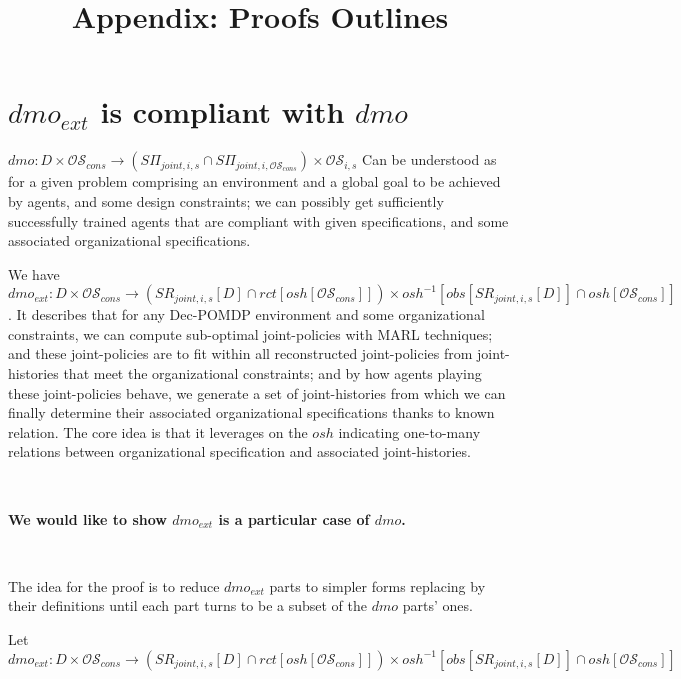 \documentclass{ecai}
\newcounter{relation}
\newcounter{proof}
\begin{document}

\begin{frontmatter}

    \title{Appendix: Proofs Outlines}

\end{frontmatter}


\section{$dmo_{ext}$ is compliant with $dmo$}

$dmo: D \times \mathcal{OS}_{cons} \rightarrow (S\Pi_{joint,i,s} \cap S\Pi_{joint,i,\mathcal{OS}_{cons}}) \times \mathcal{OS}_{i,s}$
Can be understood as for a given problem comprising an environment and a global goal to be achieved by agents, and some design constraints; we can possibly get sufficiently successfully trained agents that are compliant with given specifications, and some associated organizational specifications.

We have $dmo_{ext}: D \times \mathcal{OS}_{cons} \rightarrow (SR_{joint,i,s}[D] \cap rct[osh[\mathcal{OS}_{cons}]]) \times osh^{-1}[obs[SR_{joint,i,s}[D]] \cap osh[\mathcal{OS}_{cons}]]$.
It describes that for any Dec-POMDP environment and some organizational constraints, we can compute sub-optimal joint-policies with MARL techniques; and these joint-policies are to fit within all reconstructed joint-policies from joint-histories that meet the organizational constraints; and by  how agents playing these joint-policies behave, we generate a set of joint-histories from which we can finally determine their associated organizational specifications thanks to known relation. The core idea is that it leverages on the $osh$ indicating one-to-many relations between organizational specification and associated joint-histories.

\

\textbf{We would like to show $dmo_{ext}$ is a particular case of $dmo$.}

\

The idea for the proof is to reduce $dmo_{ext}$ parts to simpler forms replacing by their definitions until each part turns to be a subset of the $dmo$ parts' ones.

Let $dmo_{ext}: D \times \mathcal{OS}_{cons} \rightarrow (SR_{joint,i,s}[D] \cap rct[osh[\mathcal{OS}_{cons}]]) \times osh^{-1}[obs[SR_{joint,i,s}[D]] \cap osh[\mathcal{OS}_{cons}]]$ \\
\end{document}
